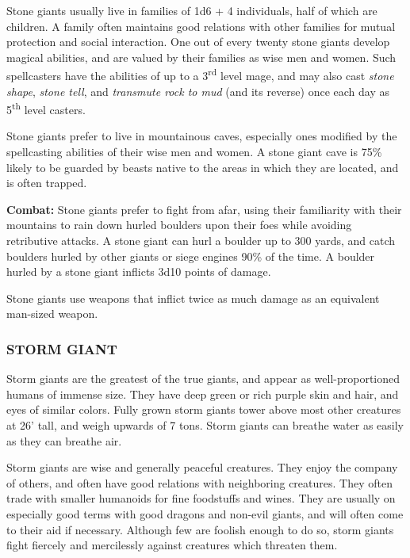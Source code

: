 \begin{multicols}{2}
Stone giants usually live in families of 1d6 + 4 individuals, half of which are children. A family often maintains good relations with other families for mutual protection and social interaction. One out of every twenty stone giants develop magical abilities, and are valued by their families as wise men and women. Such spellcasters have the abilities of up to a 3\textsuperscript{rd} level mage, and may also cast \textit{stone shape}, \textit{stone tell}, and \textit{transmute rock to mud} (and its reverse) once each day as 5\textsuperscript{th} level casters.

Stone giants prefer to live in mountainous caves, especially ones modified by the spellcasting abilities of their wise men and women. A stone giant cave is 75\% likely to be guarded by beasts native to the areas in which they are located, and is often trapped.

\textbf{Combat:} Stone giants prefer to fight from afar, using their familiarity with their mountains to rain down hurled boulders upon their foes while avoiding retributive attacks. A stone giant can hurl a boulder up to 300 yards, and catch boulders hurled by other giants or siege engines 90\% of the time. A boulder hurled by a stone giant inflicts 3d10 points of damage.

Stone giants use weapons that inflict twice as much damage as an equivalent man-sized weapon.

\subsubsection{STORM GIANT}

Storm giants are the greatest of the true giants, and appear as well-proportioned humans of immense size. They have deep green or rich purple skin and hair, and eyes of similar colors. Fully grown storm giants tower above most other creatures at 26' tall, and weigh upwards of 7 tons. Storm giants can breathe water as easily as they can breathe air.

Storm giants are wise and generally peaceful creatures. They enjoy the company of others, and often have good relations with neighboring creatures. They often trade with smaller humanoids for fine foodstuffs and wines. They are usually on especially good terms with good dragons and non-evil giants, and will often come to their aid if necessary. Although few are foolish enough to do so, storm giants fight fiercely and mercilessly against creatures which threaten them.


\end{multicols}
